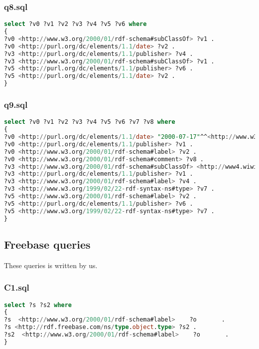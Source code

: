 \documentclass[titlepage, a4paper, 12pt] {article}
\begin{document}
\subsubsection{q8.sql}

\begin{lstlisting}[language=SQL] 
select ?v0 ?v1 ?v2 ?v3 ?v4 ?v5 ?v6 where
{
?v0 <http://www.w3.org/2000/01/rdf-schema#subClassOf> ?v1 .
?v0 <http://purl.org/dc/elements/1.1/date> ?v2 .
?v3 <http://purl.org/dc/elements/1.1/publisher> ?v4 .
?v3 <http://www.w3.org/2000/01/rdf-schema#subClassOf> ?v1 .
?v5 <http://purl.org/dc/elements/1.1/publisher> ?v6 .
?v5 <http://purl.org/dc/elements/1.1/date> ?v2 .
}
\end{lstlisting}

\subsubsection{q9.sql}

\begin{lstlisting}[language=SQL] 
select ?v0 ?v1 ?v2 ?v3 ?v4 ?v5 ?v6 ?v7 ?v8 where
{
?v0 <http://purl.org/dc/elements/1.1/date> "2000-07-17"^^<http://www.w3.org/2001/XMLSchema#date> .
?v0 <http://purl.org/dc/elements/1.1/publisher> ?v1 .
?v0 <http://www.w3.org/2000/01/rdf-schema#label> ?v2 .
?v0 <http://www.w3.org/2000/01/rdf-schema#comment> ?v8 .
?v3 <http://www.w3.org/2000/01/rdf-schema#subClassOf> <http://www4.wiwiss.fu-berlin.de/bizer/bsbm/v01/instances/ProductType2> .
?v3 <http://purl.org/dc/elements/1.1/publisher> ?v1 .
?v3 <http://www.w3.org/2000/01/rdf-schema#label> ?v4 .
?v3 <http://www.w3.org/1999/02/22-rdf-syntax-ns#type> ?v7 .
?v5 <http://www.w3.org/2000/01/rdf-schema#label> ?v2 .
?v5 <http://purl.org/dc/elements/1.1/publisher> ?v6 .
?v5 <http://www.w3.org/1999/02/22-rdf-syntax-ns#type> ?v7 .
}
\end{lstlisting}

\clearpage

\subsection{Freebase queries}\label{freebase}

These queries is written by us.

\subsubsection{C1.sql}

\begin{lstlisting}[language=SQL] 
select ?s ?s2 where
{
?s  <http://www.w3.org/2000/01/rdf-schema#label>    ?o       .
?s <http://rdf.freebase.com/ns/type.object.type> ?s2 .
?s2  <http://www.w3.org/2000/01/rdf-schema#label>    ?o       .
}
\end{lstlisting} 
\end{document}
